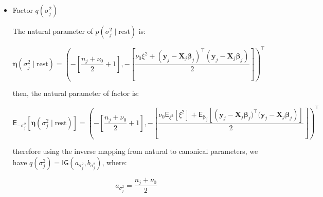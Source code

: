 \begin{appendix}
\begin{itemize}
\begin{equation}
\mathsf{E}_{-\bm{\Sigma}}\left[\bm{\eta}(\bm{\Sigma}\mid \text{rest})\right]=\left(-\frac{1}{2}\left[ \bm{S}_0 + \sum_{j=1}^{m} \mathsf{E}_{\bm{\beta}_j,\bm{\beta}}\left[\left(\bm{\beta}_j - \bm{\beta})(\bm{\beta}_j - \bm{\beta}\right)^\top\right]\right],-\left[\frac{n_0 + m + p + 1}{2}\right]\right)^\top
\end{equation}

therefore using the inverse mapping from natural to canonical parameters, we have $q(\bm{\beta})=\mathsf{IW}(\nu_{\bm{\Sigma}},\bm{S}_{\bm{\Sigma}}^{-1})$, where:

\begin{equation}
\nu_{\bm{\Sigma}} = n_0+m
\end{equation}

and

\begin{equation}
\bm{S}_{\bm{\Sigma}}= \left[ \bm{S}_0 + \sum_{j=1}^{m} \mathsf{E}_{\bm{\beta}_j,\bm{\beta}}\left[\left(\bm{\beta}_j - \bm{\beta})(\bm{\beta}_j - \bm{\beta}\right)^\top\right]\right]
\end{equation}

\item Factor $q(\sigma_j^2)$

The natural parameter of $p(\sigma_j^2\mid \text{rest}) $ is:

\begin{equation}
\bm{\eta}(\sigma_j^2\mid \text{rest})=\left(-\left[\frac{n_j + \nu_0}{2}+1\right],-\left[ \frac{ \nu_0 \xi^2 +  (\bm{y}_{j} - \bm{X}_{j} \bm{\beta}_j)^\top(\bm{y}_{j} - \bm{X}_{j} \bm{\beta}_j)}{2}\right]\right)^\top
\end{equation}

then, the natural parameter of factor is:

\begin{equation}
\mathsf{E}_{-\sigma_j^2}\left[\bm{\eta}(\sigma_j^2 \mid \text{rest})\right]=\left(-\left[\frac{n_j + \nu_0}{2}+1\right],-\left[ \frac{ \nu_0 \mathsf{E}_{\xi^2}\left[\xi^2\right] +  \mathsf{E}_{\bm{\beta}_j}\left[\left(\bm{y}_{j} - \bm{X}_{j} \bm{\beta}_j)^\top(\bm{y}_{j} - \bm{X}_{j} \bm{\beta}_j\right)\right]}{2}\right]\right)^\top
\end{equation}

therefore using the inverse mapping from natural to canonical parameters, we have $q(\sigma_j^2)=\mathsf{IG}(a_{\sigma_j^2},b_{\sigma_j^2})$, where:

\begin{equation}
a_{\sigma_j^2}= \frac{n_j + \nu_0}{2}
\end{equation}


\end{itemize}
\end{appendix}
